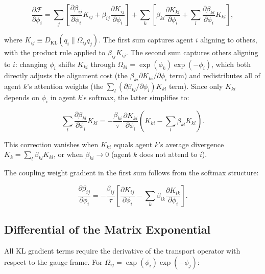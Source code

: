 \documentclass[twoside,11pt]{article}
\begin{document}
\begin{equation}
\frac{\partial \mathcal{F}}{\partial \phi_i}
= \sum_j \left[
\frac{\partial \beta_{ij}}{\partial \phi_i} K_{ij}
+ \beta_{ij} \frac{\partial K_{ij}}{\partial \phi_i}
\right]
+ \sum_k \left[
\beta_{ki} \frac{\partial K_{ki}}{\partial \phi_i}
+ \sum_l \frac{\partial \beta_{kl}}{\partial \phi_i} K_{kl}
\right],
\label{eq:phi_grad_complete}
\end{equation}

where $K_{ij} \equiv D_{\mathrm{KL}}(q_i \| \Omega_{ij} q_j)$. The first sum captures agent $i$ aligning to others, with the product rule applied to $\beta_{ij} K_{ij}$. The second sum captures others aligning to $i$: changing $\phi_i$ shifts $K_{ki}$ through $\Omega_{ki} = \exp(\phi_k)\exp(-\phi_i)$, which both directly adjusts the alignment cost (the $\beta_{ki} \partial K_{ki}/\partial \phi_i$ term) and redistributes all of agent $k$'s attention weights (the $\sum_l (\partial \beta_{kl}/\partial \phi_i) K_{kl}$ term). Since only $K_{ki}$ depends on $\phi_i$ in agent $k$'s softmax, the latter simplifies to:

\begin{equation}
\sum_l \frac{\partial \beta_{kl}}{\partial \phi_i} K_{kl}
= -\frac{\beta_{ki}}{\tau}\frac{\partial K_{ki}}{\partial \phi_i}
\left(K_{ki} - \sum_l \beta_{kl} K_{kl}\right).
\label{eq:reverse_beta_grad_phi}
\end{equation}

This correction vanishes when $K_{ki}$ equals agent $k$'s average divergence $\bar{K}_k = \sum_l \beta_{kl} K_{kl}$, or when $\beta_{ki} \to 0$ (agent $k$ does not attend to $i$).

The coupling weight gradient in the first sum follows from the softmax structure:

\begin{equation}
\frac{\partial \beta_{ij}}{\partial \phi_i} = -\frac{\beta_{ij}}{\tau}\left[
\frac{\partial K_{ij}}{\partial \phi_i} - \sum_k \beta_{ik} \frac{\partial K_{ik}}{\partial \phi_i}
\right].
\label{eq:beta_grad_phi}
\end{equation}

\subsection{Differential of the Matrix Exponential}

All KL gradient terms require the derivative of the transport operator with respect to the gauge frame. For $\Omega_{ij} = \exp(\phi_i)\exp(-\phi_j)$:
\end{document}
